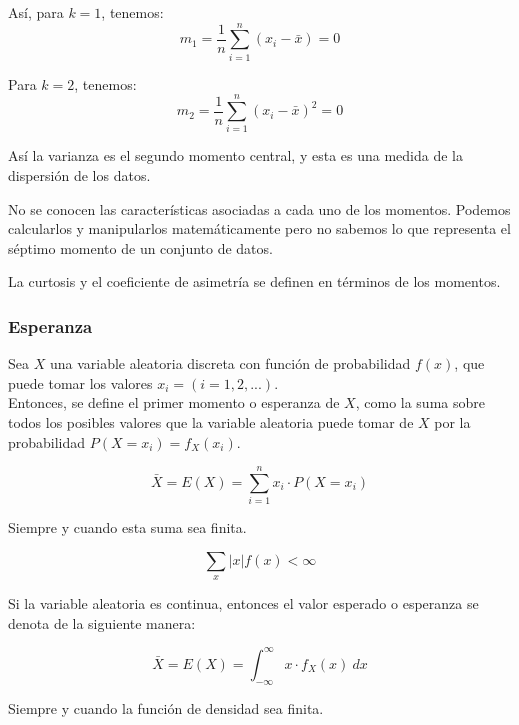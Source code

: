 Así, para $k=1$, tenemos:
\begin{equation}
  m_{1} = \frac{1}{n} \sum_{i=1}^{n} (x_{i} - \bar{x}) = 0
\end{equation}

  Para $k=2$, tenemos:
\begin{equation}
  m_{2} = \frac{1}{n} \sum_{i=1}^{n} (x_{i} - \bar{x})^2 = 0
\end{equation}

Así la varianza es el segundo momento central, y esta es una medida de la
dispersión de los datos.
  
No se conocen las características asociadas a cada uno de los momentos. Podemos
calcularlos y manipularlos matemáticamente pero no sabemos lo que representa el
séptimo momento de un conjunto de datos.

La curtosis y el coeficiente de asimetría se definen en términos de los momentos.


\subsubsection{Esperanza}

Sea $X$ una variable aleatoria discreta con función de probabilidad $f(x)$, que
puede tomar los valores $x_i=(i=1,2,...)$.\\

Entonces, se define el primer momento o esperanza de $X$, como la suma sobre todos los posibles
valores que la variable aleatoria puede tomar de $X$ por la probabilidad $P(X=x_i)=f_{X}(x_i)$.

\begin{equation}
  \bar{X} = E(X) = \sum_{i=1}^{n} x_i \cdot P(X=x_i)
  \label{eq:esperanza_discreta}
\end{equation}

Siempre y cuando esta suma sea finita.

\begin{equation}
  \sum_{x} |x| f(x) < \infty
\end{equation}

Si la variable aleatoria es continua, entonces el valor esperado o esperanza se
denota de la siguiente manera:

\begin{equation}
  \bar{X} = E(X) = \int_{-\infty}^{\infty} x \cdot f_{X}(x) \ dx
\end{equation}

Siempre y cuando la función de densidad sea finita.

